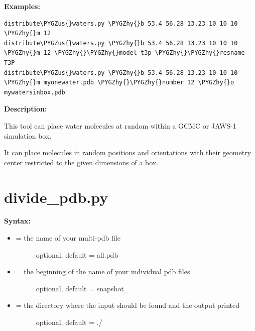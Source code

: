 \documentclass[letterpaper,10pt,english]{sphinxmanual}
\def\PYGZus{\char`\_}
\def\PYGZhy{\char`\-}
\begin{document}
\textbf{Examples:}

\begin{Verbatim}[commandchars=\\\{\}]
distribute\PYGZus{}waters.py \PYGZhy{}b 53.4 56.28 13.23 10 10 10 \PYGZhy{}m 12
distribute\PYGZus{}waters.py \PYGZhy{}b 53.4 56.28 13.23 10 10 10 \PYGZhy{}m 12 \PYGZhy{}\PYGZhy{}model t3p \PYGZhy{}\PYGZhy{}resname T3P
distribute\PYGZus{}waters.py \PYGZhy{}b 53.4 56.28 13.23 10 10 10 \PYGZhy{}m myonewater.pdb \PYGZhy{}\PYGZhy{}number 12 \PYGZhy{}o mywatersinbox.pdb
\end{Verbatim}

\textbf{Description:}

This tool can place water molecules at random within a GCMC or JAWS-1 simulation box.

It can place molecules in random positions and orientations with their geometry center restricted to the given dimensions of a box.


\section{divide\_pdb.py}
\label{tools:divide-pdb-py}
\textbf{Syntax:}

\begin{itemize}
\item {} \begin{description}
\item[{ = the name of your multi-pdb file}] \leavevmode
optional, default = all.pdb

\end{description}

\item {} \begin{description}
\item[{ = the beginning of the name of your individual pdb files}] \leavevmode
optional, default = snapshot\_

\end{description}

\item {} \begin{description}
\item[{ = the directory where the input should be found and the output printed}] \leavevmode
optional, default = ./

\end{description}

\end{itemize}
\end{document}
